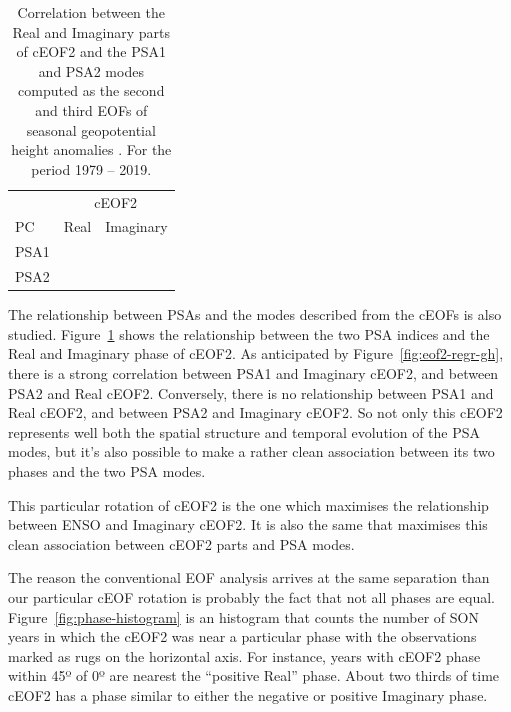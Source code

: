 \documentclass[smallextended]{svjour3}       %
\begin{document}
\begin{table}

\caption{\label{tab:psa-eof2}Correlation between the Real and Imaginary parts of cEOF2 and the PSA1 and PSA2 modes computed as the second and third EOFs of seasonal geopotential height anomalies \citep{mo2001}. For the period 1979 -- 2019.}
\centering
\begin{tabular}[t]{l>{}l>{}l}
\toprule
\multicolumn{1}{c}{} & \multicolumn{2}{c}{cEOF2} \\
\cmidrule(l{3pt}r{3pt}){2-3}
PC & Real & Imaginary\\
\midrule
PSA1 & \cellcolor[HTML]{C3BBDE}{\textcolor{black}{-0.32 (CI: -0.57 -- -0.01)}} & \cellcolor[HTML]{6058A9}{\textcolor{white}{-0.83 (CI: -0.9 -- -0.69)}}\\
PSA2 & \cellcolor[HTML]{645BAB}{\textcolor{white}{-0.81 (CI: -0.9 -- -0.67)}} & \cellcolor[HTML]{F9F1F0}{\textcolor{black}{0.059 (CI: -0.25 -- 0.36)}}\\
\bottomrule
\end{tabular}
\end{table}

The relationship between PSAs and the modes described from the cEOFs is also studied. Figure~\ref{tab:psa-eof2} shows the relationship between the two PSA indices and the Real and Imaginary phase of cEOF2. As anticipated by Figure~\ref{fig:eof2-regr-gh}, there is a strong correlation between PSA1 and Imaginary cEOF2, and between PSA2 and Real cEOF2. Conversely, there is no relationship between PSA1 and Real cEOF2, and between PSA2 and Imaginary cEOF2. So not only this cEOF2 represents well both the spatial structure and temporal evolution of the PSA modes, but it's also possible to make a rather clean association between its two phases and the two PSA modes.

This particular rotation of cEOF2 is the one which maximises the relationship between ENSO and Imaginary cEOF2. It is also the same that maximises this clean association between cEOF2 parts and PSA modes.

The reason the conventional EOF analysis arrives at the same separation than our particular cEOF rotation is probably the fact that not all phases are equal. Figure~\ref{fig:phase-histogram} is an histogram that counts the number of SON years in which the cEOF2 was near a particular phase with the observations marked as rugs on the horizontal axis. For instance, years with cEOF2 phase within 45º of 0º are nearest the ``positive Real'' phase. About two thirds of time cEOF2 has a phase similar to either the negative or positive Imaginary phase.
\end{document}
